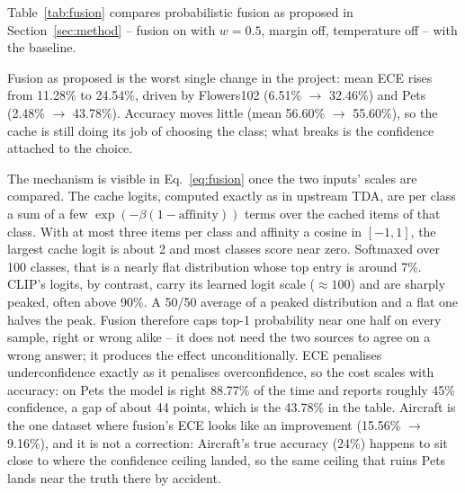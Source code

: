 Table~\ref{tab:fusion} compares probabilistic fusion as proposed in Section~\ref{sec:method}
-- fusion on with $w = 0.5$, margin off, temperature off -- with the baseline.



Fusion as proposed is the worst single change in the project: mean ECE rises from 11.28\% to
24.54\%, driven by Flowers102 (6.51\% $\rightarrow$ 32.46\%) and Pets (2.48\% $\rightarrow$
43.78\%). Accuracy moves little (mean 56.60\% $\rightarrow$ 55.60\%), so the cache is still
doing its job of choosing the class; what breaks is the confidence attached to the choice.

The mechanism is visible in Eq.~\eqref{eq:fusion} once the two inputs' scales are compared.
The cache logits, computed exactly as in upstream TDA, are per class a sum of a few
$\exp(-\beta(1 - \mathrm{affinity}))$ terms over the cached items of that class.
With at most three items per class and affinity a cosine in $[-1, 1]$, the largest cache logit
is about 2 and most classes score near zero. Softmaxed over 100 classes, that is a nearly flat
distribution whose top entry is around 7\%. CLIP's logits, by contrast, carry its learned logit
scale ($\approx 100$) and are sharply peaked, often above 90\%. A 50/50 average of a peaked
distribution and a flat one halves the peak. Fusion therefore caps top-1 probability near one
half on every sample, right or wrong alike -- it does not need the two sources to agree on a
wrong answer; it produces the effect unconditionally. ECE penalises underconfidence exactly as it
penalises overconfidence, so the cost scales with accuracy: on Pets the model is right 88.77\% of
the time and reports roughly 45\% confidence, a gap of about 44 points, which is the 43.78\% in
the table. Aircraft is the one dataset where fusion's ECE looks like an improvement (15.56\%
$\rightarrow$ 9.16\%), and it is not a correction: Aircraft's true accuracy (24\%) happens to sit
close to where the confidence ceiling landed, so the same ceiling that ruins Pets lands near the
truth there by accident.

